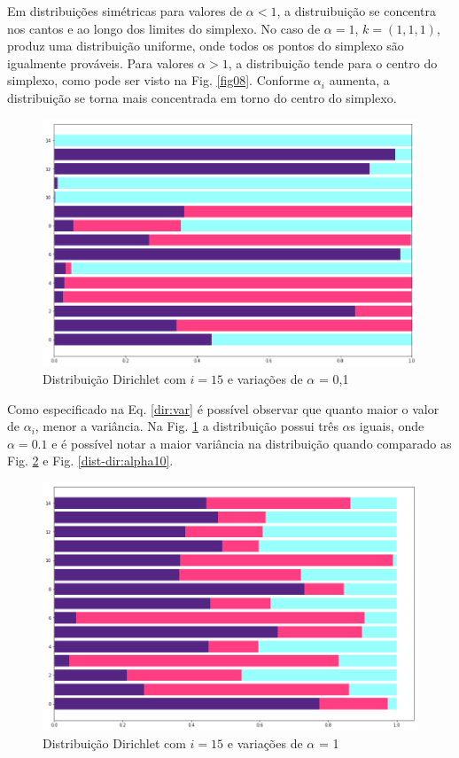 Em distribuições simétricas para valores de $\alpha<1$, a distruibuição se concentra nos cantos e ao longo dos limites do simplexo. No caso de $\alpha=1$, $k=(1,1,1)$, produz uma distribuição uniforme, onde todos os pontos do simplexo são igualmente prováveis. Para valores $\alpha>1$, a distribuição tende para o centro do simplexo, como pode ser visto na Fig. \ref{fig08}. Conforme $\alpha_i$ aumenta, a distribuição se torna mais concentrada em torno do centro do simplexo. 


\begin{figure}[!h]
	\centering
	\includegraphics[keepaspectratio=true,scale=0.4]{figuras/resultados-dist-dir-01-3.png}
	\caption{Distribuição Dirichlet com $i=15$ e variações de $\alpha$ = 0,1 }
	\label{dist-dir:alpha01}
\end{figure}

Como especificado na Eq. \ref{dir:var} é possível observar que quanto maior o valor de $\alpha_i$, menor a variância. %
Na Fig. \ref{dist-dir:alpha01} a distribuição possui três $\alpha$s iguais, onde $\alpha=0.1$ e é possível notar a maior variância na distribuição quando comparado as Fig. \ref{dist-dir:alpha1} e Fig. \ref{dist-dir:alpha10}.


\begin{figure}[!h]
	\centering
	\includegraphics[keepaspectratio=true,scale=0.4]{figuras/resultados-dist-dir-1-3.png}
	\caption{Distribuição Dirichlet com $i=15$ e variações de $\alpha$ = 1 }
	\label{dist-dir:alpha1}
\end{figure}

